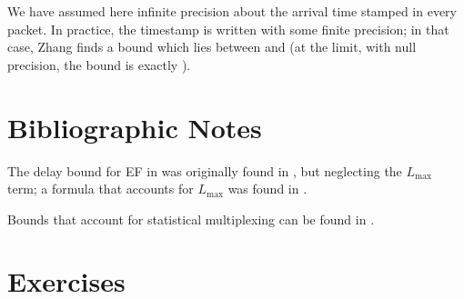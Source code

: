 We have assumed here infinite precision about the arrival time
stamped in every packet. In practice, the timestamp is written
with some finite precision; in that case, Zhang \cite{zhili01}
finds a bound which lies between  and
 (at the limit, with null precision, the bound is
exactly ).



\section{Bibliographic Notes}
The delay bound for EF in  was originally
found in \cite{qofis2000}, but neglecting the $L_{\max}$ term; a
formula that accounts for $L_{\max}$ was found in \cite{jiang01}.

Bounds that account for statistical multiplexing can be found in
\cite{VL2002EF}.
\section{Exercises}








%
%
%
